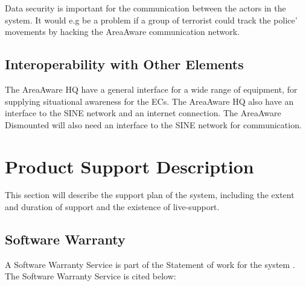 Data security is important for the communication between the actors in the system. It would e.g be a problem if a group of terrorist could track the police’ movements by hacking the AreaAware communication network.

\subsection{Interoperability with Other Elements}
The AreaAware HQ have a general interface for a wide range of equipment, for supplying situational awareness for the ECs. The AreaAware HQ also have an interface to the SINE network and an internet connection. The AreaAware Dismounted will also need an interface to the SINE network for communication.

\newpage
\section{Product Support Description}
This section will describe the support plan of the system, including the extent and duration of support and the existence of live-support. 

\subsection{Software Warranty}
A Software Warranty Service is part of the Statement of work for the system \cite{Casebook}. The Software Warranty Service is cited below: \\

